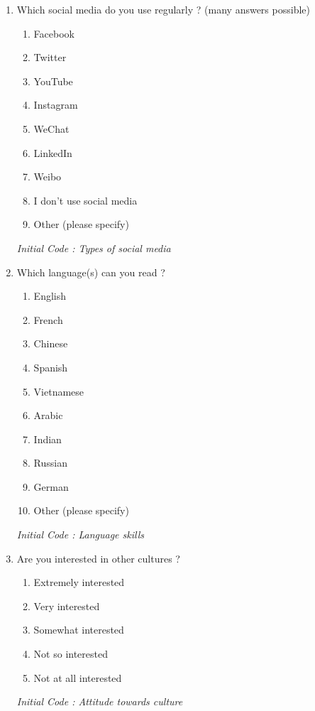 \documentclass[conference]{IEEEtran}
\begin{document}
\begin{enumerate}
    \item Which social media do you use regularly ? (many answers possible)
    \begin{enumerate}
        \item Facebook
        \item Twitter
        \item YouTube
        \item Instagram
        \item WeChat
        \item LinkedIn
        \item Weibo
        \item I don't use social media
        \item Other (please specify)
    \end{enumerate}
    \textit{Initial Code : Types of social media}
    \item Which language(s) can you read ?
    \begin{enumerate}
        \item English
        \item French
        \item Chinese
        \item Spanish
        \item Vietnamese
        \item Arabic
        \item Indian
        \item Russian
        \item German
        \item Other (please specify)
    \end{enumerate}
    \textit{Initial Code : Language skills}

    \item Are you interested in other cultures ?
    \begin{enumerate}
        \item Extremely interested
        \item Very interested
        \item Somewhat interested
        \item Not so interested
        \item Not at all interested
    \end{enumerate}
    \textit{Initial Code : Attitude towards culture}


\end{enumerate}
\end{document}
